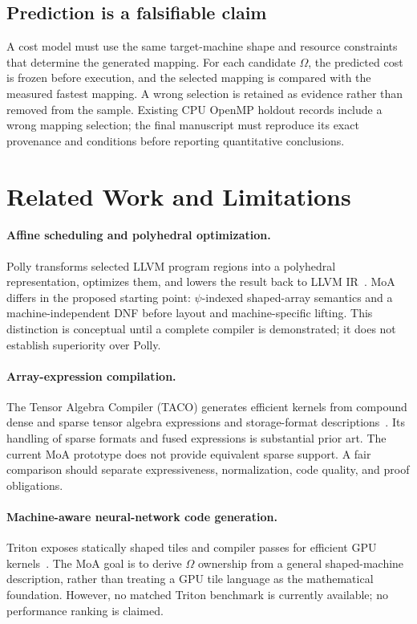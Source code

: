 \documentclass[sigplan,10pt,review,anonymous]{acmart}
\begin{document}
\subsection{Prediction is a falsifiable claim}
A cost model must use the same target-machine shape and resource constraints that determine the generated mapping. For each candidate $\Omega$, the predicted cost is frozen before execution, and the selected mapping is compared with the measured fastest mapping. A wrong selection is retained as evidence rather than removed from the sample. Existing CPU OpenMP holdout records include a wrong mapping selection; the final manuscript must reproduce its exact provenance and conditions before reporting quantitative conclusions.

\section{Related Work and Limitations}
\paragraph{Affine scheduling and polyhedral optimization.}
Polly transforms selected LLVM program regions into a polyhedral representation, optimizes them, and lowers the result back to LLVM IR~\cite{grosser2011polly}. MoA differs in the proposed starting point: $\psi$-indexed shaped-array semantics and a machine-independent DNF before layout and machine-specific lifting. This distinction is conceptual until a complete compiler is demonstrated; it does not establish superiority over Polly.

\paragraph{Array-expression compilation.}
The Tensor Algebra Compiler (TACO) generates efficient kernels from compound dense and sparse tensor algebra expressions and storage-format descriptions~\cite{kjolstad2017taco}. Its handling of sparse formats and fused expressions is substantial prior art. The current MoA prototype does not provide equivalent sparse support. A fair comparison should separate expressiveness, normalization, code quality, and proof obligations.

\paragraph{Machine-aware neural-network code generation.}
Triton exposes statically shaped tiles and compiler passes for efficient GPU kernels~\cite{tillet2019triton}. The MoA goal is to derive $\Omega$ ownership from a general shaped-machine description, rather than treating a GPU tile language as the mathematical foundation. However, no matched Triton benchmark is currently available; no performance ranking is claimed.
\end{document}
